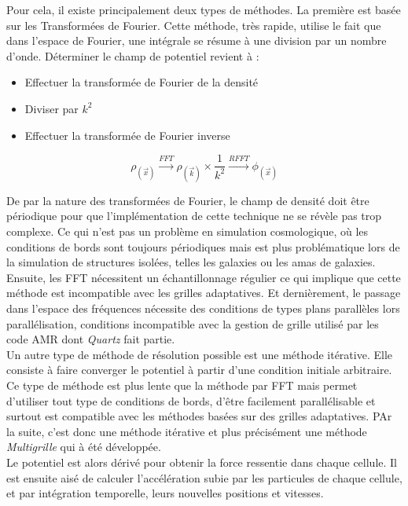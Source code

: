 Pour cela, il existe principalement deux types de méthodes. La première est basée sur les Transformées de Fourier. Cette méthode, très rapide, utilise le fait que dans l'espace de Fourier, une intégrale se résume à une division par un nombre d'onde. Déterminer le champ de potentiel revient à : 
\begin{itemize}
\item Effectuer la transformée de Fourier de la densité
\item Diviser par $k^2$
\item Effectuer la transformée de Fourier inverse
\end{itemize}

\begin{equation}
\rho_{(\vec{x})} \overset{FFT}{\longrightarrow}  \rho_{(\vec{k})} \times \frac{1}{k^2}  \overset{RFFT}{\longrightarrow}  \phi_{(\vec{x})}
\end{equation}

De par la nature des transformées de Fourier, le champ de densité doit être périodique pour que l'implémentation de cette technique ne se révèle pas trop complexe. Ce qui n'est pas un problème en simulation cosmologique, où les conditions de bords sont toujours périodiques mais est plus problématique lors de la simulation de structures isolées, telles les galaxies ou les amas de galaxies. Ensuite, les FFT nécessitent un échantillonnage régulier ce qui implique que cette méthode est incompatible avec les grilles adaptatives. Et dernièrement, le passage dans l'espace des fréquences nécessite des conditions de types plans parallèles lors parallélisation, conditions incompatible avec la gestion de grille utilisé par les code AMR dont \emph{Quartz} fait partie. \\

Un autre type de méthode de résolution possible est une méthode itérative. Elle consiste à faire converger le potentiel à partir d'une condition initiale arbitraire. Ce type de méthode est plus lente que la méthode par FFT mais  permet d'utiliser tout type de conditions de bords, d'être facilement parallélisable et surtout est compatible avec les méthodes basées sur des grilles adaptatives. PAr la suite, c'est donc une méthode itérative et plus précisément une méthode \emph{Multigrille} qui à été développée.\\

Le potentiel est alors dérivé pour obtenir la force ressentie dans chaque cellule. Il est ensuite aisé de calculer l'accélération subie par les particules de chaque cellule, et par intégration temporelle, leurs nouvelles positions et vitesses.


